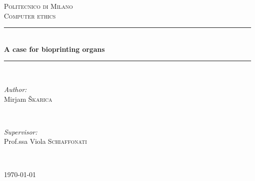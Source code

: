 \documentclass[12pt]{article} %
\begin{document}

\begin{titlepage}

\newcommand{\HRule}{\rule{\linewidth}{0.5mm}} %

\center %

\textsc{\LARGE Politecnico di Milano}\\[1.5cm] %
\textsc{\large Computer ethics}\\[0.5cm] %

\HRule \\[0.8cm]
{ \huge \bfseries A case for bioprinting organs}\\[0.4cm] %
\HRule \\[1.5cm]

\begin{minipage}{0.4\textwidth}
\begin{flushleft} \large
\emph{Author:}\\
Mirjam \textsc{Škarica} %
\end{flushleft}
\end{minipage}
~
\begin{minipage}{0.4\textwidth}
\begin{flushright} \large
\emph{Supervisor:} \\
Prof.ssa Viola \textsc{Schiaffonati} %
\end{flushright}
\end{minipage}\\[4cm]


\vfill %

{\large \today}\\[3cm] %

\end{titlepage}

\end{document}
